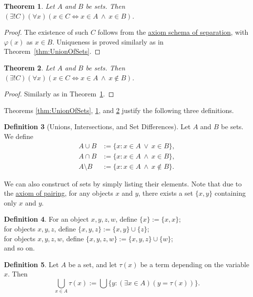 \documentclass[a4paper,11pt]{article}
\theoremstyle{plain}
\newtheorem{thm}{Theorem}[subsection]
\theoremstyle{definition}
\newtheorem{defn}[thm]{Definition}
\theoremstyle{remark}
\begin{document}
\begin{thm}
\label{thm:IntersectionOfSets}
Let $A$ and $B$ be sets. Then $(\exists! C)(\forall x)(x \in C \iff x \in A \ \land \ x \in B)$.
\end{thm}
\begin{proof}
The existence of such $C$ follows from the \hyperref[axiom:separation]{axiom schema of separation}, with $\varphi(x)$ as $x \in B$. Uniqueness is proved similarly as in Theorem~\ref{thm:UnionOfSets}.
\end{proof}

\begin{thm}
\label{thm:DifferenceOfSets}
Let $A$ and $B$ be sets. Then $(\exists! C)(\forall x)(x \in C \iff x \in A \ \land \ x \notin B)$.
\end{thm}
\begin{proof}
Similarly as in Theorem~\ref{thm:IntersectionOfSets}.
\end{proof}

Theorems \ref{thm:UnionOfSets}, \ref{thm:IntersectionOfSets}, and \ref{thm:DifferenceOfSets} justify the following three definitions.
\begin{defn}[Unions, Intersections, and Set Differences]
\label{defn:SetAlgebra}
Let $A$ and $B$ be sets. We define 
\begin{align*}
A \cup B &:= \{x : x \in A\  \lor \ x \in B\}, \\
A \cap B &:= \{x : x \in A\  \land \ x \in B\}, \\
A \setminus B &:= \{x : x \in A\  \land \ x \notin B\}.
\end{align*}
\end{defn}

We can also construct of sets by simply listing their elements. Note that due to the \hyperref[axiom:pairing]{axiom of pairing}, for any objects $x$ and $y$, there exists a set $\{x,y\}$ containing only $x$ and $y$.
\begin{defn}
For an object $x, y, z, w$, define $\{x\} := \{x, x\}$; \\
for objects $x, y, z$, define $\{x, y, z\} := \{x, y\} \cup \{z\}$; \\
for objects $x, y, z, w$, define $\{x, y, z, w\} := \{x, y, z\} \cup \{w\}$; \\
and so on.
\end{defn}

\begin{defn}
Let $A$ be a set, and let $\tau(x)$ be a term depending on the variable $x$. Then
\[\bigcup_{x\in A}\tau(x) := \bigcup \{y:(\exists x\in A)(y=\tau(x))\}.\]
\end{defn}
\end{document}
